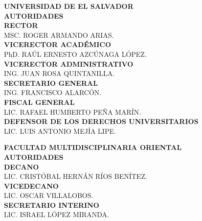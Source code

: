 \newpage
\begin{center}
	\thispagestyle{empty}%
	\begin{large}
		\textbf{
			UNIVERSIDAD DE EL SALVADOR\\
			\vspace{0.5in}
			AUTORIDADES\\
			\vspace{0.8in}
			RECTOR\\
		}
		MSC. ROGER ARMANDO ARIAS.\\
		\vspace{0.8in}
		\textbf{VICERECTOR ACADÉMICO}\\
		PhD. RAÚL ERNESTO AZCÚNAGA LÓPEZ.\\
		\vspace{0.8in}
		\textbf{VICERECTOR ADMINISTRATIVO}\\
		ING. JUAN ROSA QUINTANILLA.\\
		\vspace{0.8in}
		\textbf{SECRETARIO GENERAL}\\
		ING. FRANCISCO ALARCÓN.\\
		\vspace{0.8in}
		\textbf{FISCAL GENERAL}\\
		LIC. RAFAEL HUMBERTO PEÑA MARÍN.\\
		\vspace{0.8in}
		\textbf{DEFENSOR DE LOS DERECHOS UNIVERSITARIOS}\\
		LIC. LUIS ANTONIO MEJÍA LIPE.\\
	\end{large}
	\newpage
	\thispagestyle{empty}%
	\begin{large}
		\textbf{
			FACULTAD MULTIDISCIPLINARIA ORIENTAL\\
			\vspace{0.8in}
			AUTORIDADES\\
			\vspace{1.0in}
			DECANO\\
		}
		LIC. CRISTÓBAL HERNÁN RÍOS BENÍTEZ.\\
		\vspace{1.0in}
		\textbf{VICEDECANO}\\
		LIC. OSCAR VILLALOBOS.\\
		\vspace{1.0in}
		\textbf{SECRETARIO INTERINO}\\
		LIC. ISRAEL LÓPEZ MIRANDA.\\
		\vspace{1.0in}

\end{large}
\end{center}
